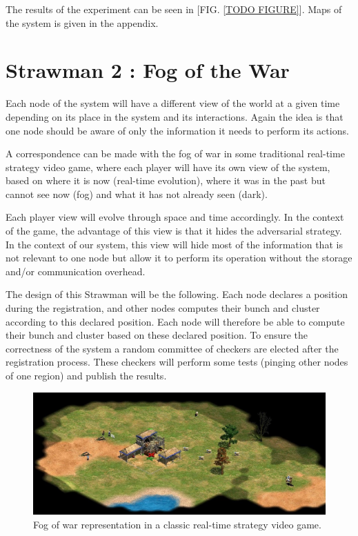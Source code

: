 \documentclass[a4paper,11pt,oneside]{report}
\begin{document}
The results of the experiment can be seen in [FIG. \ref{TODO FIGURE}]. Maps of
the system is given in the appendix.

\section{Strawman 2 : Fog of the War}

Each node of the system will have a different view of the world at a given time
depending on its place in the system and its interactions. Again the idea is
that one node should be aware of only the information it needs to perform its
actions. 

A correspondence can be made with the fog of war in some traditional real-time
strategy video game, where each player will have its own view of the system,
based on where it is now (real-time evolution), where it was in the past but
cannot see now (fog) and what it has not already seen (dark).

Each player view will evolve through space and time accordingly. In the context
of the game, the advantage of this view is that it hides the adversarial
strategy. In the context of our system, this view will hide most of the
information that is not relevant to one node but allow it to perform its
operation without the storage and/or communication overhead. 

The design of this Strawman will be the following. Each node declares a
position during the registration, and other nodes computes their bunch and
cluster according to this declared position. Each node will therefore be able
to compute their bunch and cluster based on these declared position. To ensure
the correctness of the system a random committee of checkers are elected after
the registration process. These checkers will perform some tests (pinging other
nodes of one region) and publish the results. 

\begin{figure}[!h] 
\centering
\includegraphics[width=400pt]{figures/fog_of_war}
\caption{Fog of war representation in a classic real-time strategy video game. }
\label{fig:registrationprotocol}
\end{figure}
\end{document}
